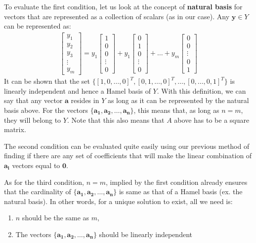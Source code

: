 To evaluate the first condition, let us look at the concept of \textbf{natural basis} for vectors that are represented as a collection of scalars (as in our case). Any \( \textbf{y} \in Y \) can be represented as:
	\begin{align*}
	\begin{bmatrix}
	y_1 \\
	y_2 \\
	y_3 \\
	\vdots \\
	y_m
	\end{bmatrix} =
	y_1
	\begin{bmatrix}
	1 \\
	0 \\
	0 \\
	\vdots \\
	0
	\end{bmatrix} +
	y_1
	\begin{bmatrix}
	0 \\
	1 \\
	0 \\
	\vdots \\
	0
	\end{bmatrix} + \ldots +
	y_m
	\begin{bmatrix}
	0 \\
	0 \\
	\vdots \\
	0 \\
	1
	\end{bmatrix}
	\end{align*}
	It can be shown that the set \( \{ [1,0,\ldots,0]^T, [0,1,\ldots,0]^T, \ldots, [0,\ldots,0,1]^T \} \) is linearly independent and hence a Hamel basis of \(Y\). With this definition, we can say that any vector \(\mathbf{a}\) resides in \(Y\) as long as it can be represented by the natural basis above. For the vectors \( \{ \mathbf{a_1}, \mathbf{a_2}, \ldots, \mathbf{a_n}\} \), this means that, as long as \(n = m\), they will belong to \(Y\). Note that this also means that \(A\) above has to be a square matrix.

The second condition can be evaluated quite easily using our previous method of finding if there are any set of coefficients that will make the linear combination of \( \mathbf{a_i} \) vectors equal to \(\mathbf{0}\). 

As for the third condition,  \(n = m\), implied by the first condition already ensures that the cardinality of  \( \{ \mathbf{a_1}, \mathbf{a_2}, \ldots, \mathbf{a_n}\} \) is same as that of a Hamel basis (ex. the natural basis). In other words, for a unique solution to exist, all we need is:
	\begin{enumerate}
	\item \(n\) should be the same as \(m\), 
	\item The vectors  \( \{ \mathbf{a_1}, \mathbf{a_2}, \ldots, \mathbf{a_n}\} \) should be linearly independent
	\end{enumerate}
	
